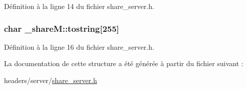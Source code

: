 Définition à la ligne 14 du fichier share\-\_\-server.\-h.

\hypertarget{struct__share_m_a3f1adf9dcef316bf853e709401b041fd}{
\subsubsection[{tostring}]{\setlength{\rightskip}{0pt plus 5cm}char \-\_\-share\-M\-::tostring\mbox{[}255\mbox{]}}}\label{struct__share_m_a3f1adf9dcef316bf853e709401b041fd}


Définition à la ligne 16 du fichier share\-\_\-server.\-h.



La documentation de cette structure a été générée à partir du fichier suivant \-:\begin{DoxyCompactItemize}
\item 
headers/server/\hyperlink{share__server_8h}{share\-\_\-server.\-h}\end{DoxyCompactItemize}
